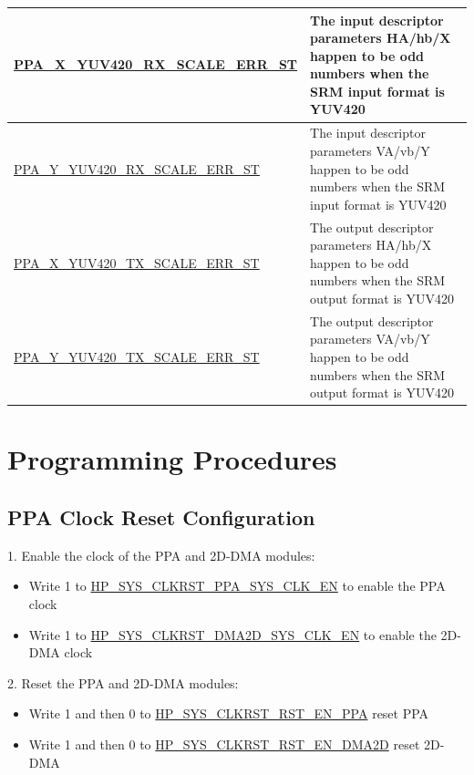 \documentclass[main\_\_EN.tex]{subfiles}
\begin{document}
\begin{longtable}[c]{ |p{6cm}|p{10cm}| }
        \hyperref[fielddesc:PPAXYUV420RXSCALEERRST]{PPA\_X\_YUV420\_RX\_SCALE\_ERR\_ST} & The input descriptor parameters HA/hb/X happen to be odd numbers when the SRM input format is YUV420  \\\hline
        \hyperref[fielddesc:PPAYYUV420RXSCALEERRST]{PPA\_Y\_YUV420\_RX\_SCALE\_ERR\_ST} & The input descriptor parameters VA/vb/Y happen to be odd numbers when the SRM input format is YUV420 \\\hline
        \hyperref[fielddesc:PPAXYUV420TXSCALEERRST]{PPA\_X\_YUV420\_TX\_SCALE\_ERR\_ST} & The output descriptor parameters HA/hb/X happen to be odd numbers when the SRM output format is YUV420 \\\hline
        \hyperref[fielddesc:PPAYYUV420TXSCALEERRST]{PPA\_Y\_YUV420\_TX\_SCALE\_ERR\_ST} & The output descriptor parameters VA/vb/Y happen to be odd numbers when the SRM output format is YUV420 \\\hline

\end{longtable}



\section{Programming Procedures}
\label{sec:ppa-prog-procedures}

\subsection{PPA Clock Reset Configuration}
\label{sec:ppa_clk_rst}

1. Enable the clock of the PPA and 2D-DMA modules:
\begin{itemize}
    \item Write 1 to \hyperref[fielddesc:HPSYSCLKRSTPPASYSCLKEN]{HP\_SYS\_CLKRST\_PPA\_SYS\_CLK\_EN} to enable the PPA clock
    \item Write 1 to \hyperref[fielddesc:HPSYSCLKRSTDMA2DSYSCLKEN]{HP\_SYS\_CLKRST\_DMA2D\_SYS\_CLK\_EN} to enable the 2D-DMA clock
\end{itemize}

2. Reset the PPA and 2D-DMA modules:
\begin{itemize}
    \item Write 1 and then 0 to \hyperref[fielddesc:HPSYSCLKRSTRSTENPPA]{HP\_SYS\_CLKRST\_RST\_EN\_PPA} reset PPA
    \item Write 1 and then 0 to \hyperref[fielddesc:HPSYSCLKRSTRSTENDMA2D]{HP\_SYS\_CLKRST\_RST\_EN\_DMA2D} reset 2D-DMA
\end{itemize}
\end{document}
